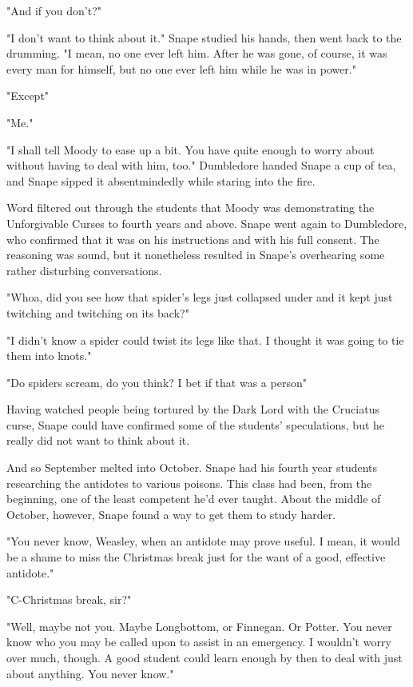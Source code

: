 "And if you don't?"

"I don't want to think about it." Snape studied his hands, then went back to the drumming. "I mean, no one ever left him. After he was gone, of course, it was every man for himself, but no one ever left him while he was in power."

"Except{\el}"

"Me."

"I shall tell Moody to ease up a bit. You have quite enough to worry about without having to deal with him, too." Dumbledore handed Snape a cup of tea, and Snape sipped it absentmindedly while staring into the fire.

Word filtered out through the students that Moody was demonstrating the Unforgivable Curses to fourth years and above. Snape went again to Dumbledore, who confirmed that it was on his instructions and with his full consent. The reasoning was sound, but it nonetheless resulted in Snape's overhearing some rather disturbing conversations.

"Whoa, did you see how that spider's legs just collapsed under and it kept just twitching and twitching on its back?"

"I didn't know a spider could twist its legs like that. I thought it was going to tie them into knots."

"Do spiders scream, do you think? I bet if that was a person{\el}"

Having watched people being tortured by the Dark Lord with the Cruciatus curse, Snape could have confirmed some of the students' speculations, but he really did not want to think about it.

And so September melted into October. Snape had his fourth year students researching the antidotes to various poisons. This class had been, from the beginning, one of the least competent he'd ever taught. About the middle of October, however, Snape found a way to get them to study harder.

"You never know, Weasley, when an antidote may prove useful. I mean, it would be a shame to miss the Christmas break just for the want of a good, effective antidote."

"C-Christmas break, sir?"

"Well, maybe not you. Maybe Longbottom, or Finnegan. Or Potter. You never know who you may be called upon to assist in an emergency. I wouldn't worry over much, though. A good student could learn enough by then to deal with just about anything. You never know."

